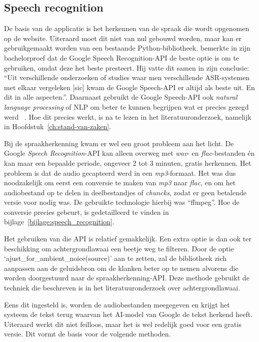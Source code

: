 \subsection{Speech recognition}
De basis van de applicatie is het herkennen van de spraak die wordt opgenomen op de website. Uiteraard moet dit niet van nul gebouwd worden, maar kan er gebruikgemaakt worden van een bestaande Python-bibliotheek. \textcite{Standaert2021} bemerkte in zijn bachelorproef dat  de Google Speech Recognition-API de beste optie is om te gebruiken, omdat deze het beste presteert. Hij vatte dit samen in zijn conclusie: ``Uit verschillende onderzoeken of studies waar men verschillende ASR-systemen met elkaar vergeleken [sic] kwam de Google Speech-API er altijd als beste uit. En dit in alle aspecten.''. Daarnaast gebruikt de Google Speech-API ook \textit{natural language processing} of NLP om beter te kunnen begrijpen wat er precies gezegd werd ~\autocite{GoogleCloud2022}. Hoe dit precies werkt, is na te lezen in het literatuuronderzoek, namelijk in Hoofdstuk~\ref{ch:stand-van-zaken}.

Bij de spraakherkenning kwam er wel een groot probleem aan het licht. De Google \textit{Speech Recognition}-API kan alleen overweg met \textit{wav}- en \textit{flac}-bestanden én kan maar een bepaalde periode, ongeveer 2 tot 3 minuten, gratis herkennen. Het probleem is dat de audio gecapteerd werd in een \textit{mp3}-formaat. Het was dus noodzakelijk om eerst een conversie te maken van \textit{mp3} naar \textit{flac}, en om het audiobestand op te delen in deelbestandjes of \textit{chuncks}, zodat er geen betalende versie voor nodig was. De gebruikte technologie hierbij was ``ffmpeg''. Hoe de conversie precies gebeurt, is gedetailleerd te vinden in bijlage~\ref{bijlage:speech_recognition}.

Het gebruiken van die API is relatief gemakkelijk. Een extra optie is dan ook ter beschikking om achtergrondlawaai een beetje weg te filteren. Door de optie \newline`ajust\_for\_ambient\_noice(source)' aan te zetten, zal de bibliotheek zich aanpassen aan de geluidsbron om de klanken beter op te nemen alvorens die worden doorgestuurd naar de spraakherkenning-API. Deze methode gebruikt de techniek die beschreven is in het literatuuronderzoek over achtergrondlawaai.

Eens dit ingesteld is, worden de audiobestanden meegegeven en krijgt het systeem de tekst terug waarvan het AI-model van Google de tekst herkend heeft. Uiteraard werkt dit niet feilloos, maar het is wel redelijk goed voor een gratis versie. Dit vormt de basis voor de volgende methoden.

